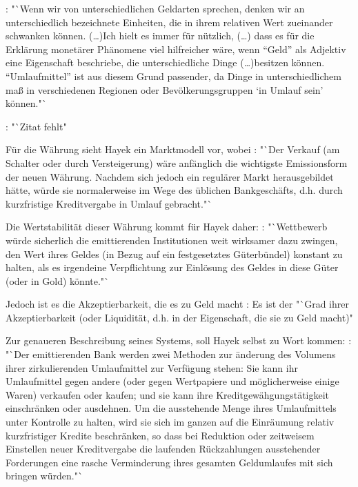 \documentclass[
        onecolumn,
        a4paper,
        abstracton,
        parskip=half
        ,final
        ]{scrartcl}
\begin{document}
\citep[vgl.][S.40f]{Hayek1977}: "`Wenn wir von unterschiedlichen Geldarten sprechen, denken wir an unterschiedlich bezeichnete Einheiten, die in ihrem relativen Wert zueinander schwanken k{\"o}nnen. (\ldots)Ich hielt es immer f{\"u}r n{\"u}tzlich, (\ldots) dass es f{\"u}r die Erkl{\"a}rung monet{\"a}rer Ph{\"a}nomene viel hilfreicher w{\"a}re, wenn "`Geld"' als Adjektiv eine Eigenschaft beschriebe, die unterschiedliche Dinge (\ldots)besitzen k{\"o}nnen. "`Umlaufmittel"' ist aus diesem Grund passender, da Dinge in unterschiedlichem ma{\ss} in verschiedenen Regionen oder Bev{\"o}lkerungsgruppen `in Umlauf sein' k{\"o}nnen."`

\citep[vgl.][S.43]{Hayek1977}: "`Zitat fehlt"

F{\"u}r die W{\"a}hrung sieht Hayek ein Marktmodell vor, wobei \citep[vgl.][S.31]{Hayek1977}: "`Der Verkauf (am Schalter oder durch Versteigerung) w{\"a}re anf{\"a}nglich die wichtigste Emissionsform der neuen W{\"a}hrung. Nachdem sich jedoch ein regul{\"a}rer Markt herausgebildet h{\"a}tte, w{\"u}rde sie normalerweise im Wege des {\"u}blichen Bankgesch{\"a}fts, d.h. durch kurzfristige Kreditvergabe in Umlauf gebracht."`

Die Wertstabilit{\"a}t dieser W{\"a}hrung kommt f{\"u}r Hayek daher: \citep[vgl.][S.32]{Hayek1977}: "`Wettbewerb w{\"u}rde sicherlich die emittierenden Institutionen weit wirksamer dazu zwingen, den Wert ihres Geldes (in Bezug auf ein festgesetztes G{\"u}terb{\"u}ndel) konstant zu halten, als es irgendeine Verpflichtung zur Einl{\"o}sung des Geldes in diese G{\"u}ter (oder in Gold) k{\"o}nnte."`

Jedoch ist es die Akzeptierbarkeit, die es zu Geld macht \citep[vgl.][S.40]{Hayek1977}: Es ist der "`Grad ihrer Akzeptierbarkeit (oder Liquidit{\"a}t, d.h. in der Eigenschaft, die sie zu Geld macht)"

Zur genaueren Beschreibung seines Systems, soll Hayek selbst zu Wort kommen: \citep[vgl.][S.45]{Hayek1977}: "`Der emittierenden Bank werden zwei Methoden zur {\"a}nderung des Volumens ihrer zirkulierenden Umlaufmittel zur Verf{\"u}gung stehen: Sie kann ihr Umlaufmittel gegen andere (oder gegen Wertpapiere und m{\"o}glicherweise einige Waren) verkaufen oder kaufen; und sie kann ihre Kreditgew{\"a}hgungst{\"a}tigkeit einschr{\"a}nken oder ausdehnen. Um die ausstehende Menge ihres Umlaufmittels unter Kontrolle zu halten, wird sie sich im ganzen auf die Einr{\"a}umung relativ kurzfristiger Kredite beschr{\"a}nken, so dass bei Reduktion oder zeitweisem Einstellen neuer Kreditvergabe die laufenden R{\"u}ckzahlungen ausstehender Forderungen eine rasche Verminderung ihres gesamten Geldumlaufes mit sich bringen w{\"u}rden."`
\end{document}
